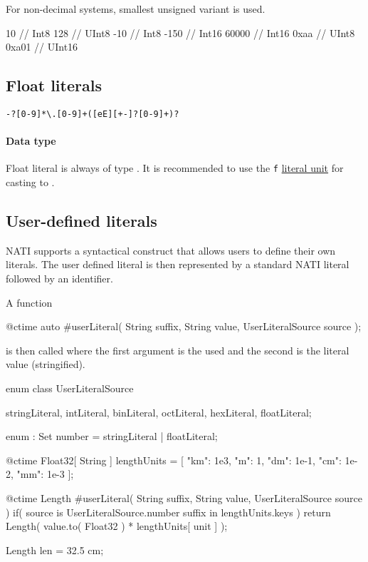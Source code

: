 For non-decimal systems, smallest unsigned variant is used.

\begin{code}
10 // Int8
128 // UInt8
-10 // Int8
-150 // Int16
60000 // Int16
0xaa // UInt8
0xa01 // UInt16
\end{code}

\subsection{Float literals}
\begin{grammar}
	 \verb|-?[0-9]*\.[0-9]+([eE][+-]?[0-9]+)?|
\end{grammar}

\paragraph{Data type} Float literal is always of type . It is recommended to use the \verb|f| \hyperref[literalUnits]{literal unit} for casting to .

\subsection{User-defined literals}
NATI supports a syntactical construct that allows users to define their own literals. The user defined literal is then represented by a standard NATI literal followed by an identifier.

A function
\begin{code}
@ctime auto #userLiteral( String suffix, String value, UserLiteralSource source );
\end{code}
is then called where the first argument is the  used and the second is the literal value (stringified).

\begin{code}
enum class UserLiteralSource {
	stringLiteral,
	intLiteral,
	binLiteral,
	octLiteral,
	hexLiteral,
	floatLiteral;
	
	enum : Set {
		number = stringLiteral | floatLiteral;	
	}
}
\end{code}

\begin{code}
@ctime Float32[ String ] lengthUnits = [
	"km": 1e3, "m": 1, "dm": 1e-1, "cm": 1e-2, "mm": 1e-3
];
	
@ctime Length #userLiteral( String suffix, String value, UserLiteralSource source )
	if( source is UserLiteralSource.number suffix in lengthUnits.keys )
{
	return Length( value.to( Float32 ) * lengthUnits[ unit ] );
}

Length len = 32.5 cm;
\end{code}

